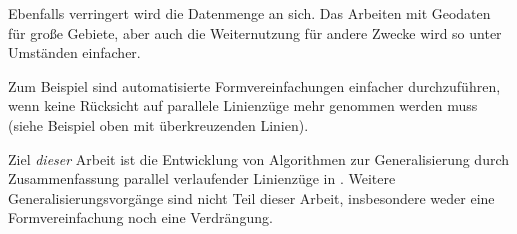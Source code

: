 \documentclass[../main/thesis.tex]{subfiles}
\begin{document}
Ebenfalls verringert wird die Datenmenge an sich. Das Arbeiten mit Geodaten für große Gebiete, aber auch die Weiternutzung für andere Zwecke wird so unter Umständen einfacher.

Zum Beispiel sind automatisierte Formvereinfachungen einfacher durchzuführen, wenn keine Rücksicht auf parallele Linienzüge mehr genommen werden muss (siehe Beispiel oben mit überkreuzenden Linien).

Ziel \emph{dieser} Arbeit ist die Entwicklung von Algorithmen zur Generalisierung durch Zusammenfassung parallel verlaufender Linienzüge in \osm{}. Weitere Generalisierungsvorgänge sind nicht Teil dieser Arbeit, insbesondere weder eine Formvereinfachung noch eine Verdrängung.

%	
%	
%	
\end{document}
